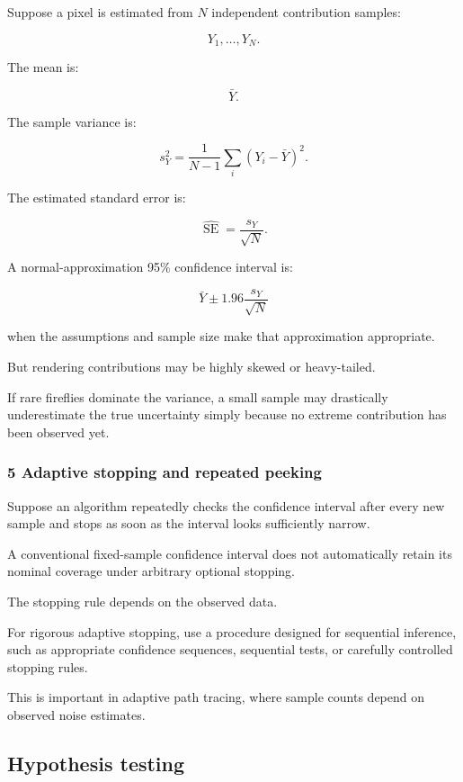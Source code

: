 Suppose a pixel is estimated from \(N\) independent contribution samples:

\[
 Y_1,\ldots,Y_N.
\]

The mean is:

\[
 \bar Y.
\]

The sample variance is:

\[
 s_Y^2= \frac1{N-1}\sum_i(Y_i-\bar Y)^2.
\]

The estimated standard error is:

\[
 \boxed{ \widehat{\operatorname{SE}}= \frac{s_Y}{\sqrt N} }.
\]

A normal-approximation 95\% confidence interval is:

\[
 \boxed{ \bar Y\pm1.96\frac{s_Y}{\sqrt N} }
\]

when the assumptions and sample size make that approximation appropriate.

But rendering contributions may be highly skewed or heavy-tailed.

If rare fireflies dominate the variance, a small sample may drastically underestimate the true uncertainty simply because no extreme contribution has been observed yet.

\subsubsection{5 Adaptive stopping and repeated peeking}\label{02-foundations-ii-ch030-adaptive-stopping-and-repeated-peeking}

Suppose an algorithm repeatedly checks the confidence interval after every new sample and stops as soon as the interval looks sufficiently narrow.

A conventional fixed-sample confidence interval does not automatically retain its nominal coverage under arbitrary optional stopping.

The stopping rule depends on the observed data.

For rigorous adaptive stopping, use a procedure designed for sequential inference, such as appropriate confidence sequences, sequential tests, or carefully controlled stopping rules.

This is important in adaptive path tracing, where sample counts depend on observed noise estimates.

\subsection{Hypothesis testing}\label{02-foundations-ii-ch030-hypothesis-testing}

